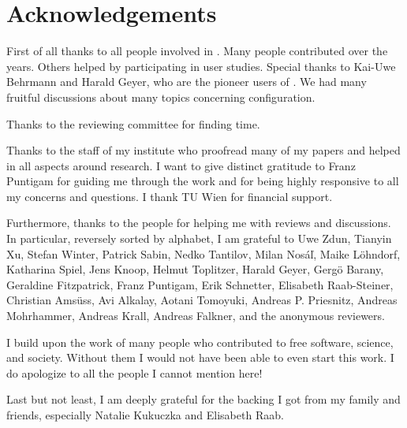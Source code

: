 \chapter{Acknowledgements}


First of all thanks to all people involved in \elektra{}.
Many people contributed over the years.
Others helped by participating in user studies.
Special thanks to Kai-Uwe Behrmann and Harald Geyer, who are the pioneer users of \elektra{}.
We had many fruitful discussions about many topics concerning configuration.

Thanks to the reviewing committee for finding time.

Thanks to the staff of my institute who proofread many of my papers and helped in all aspects around research.
I want to give distinct gratitude to Franz Puntigam for guiding me through the work and for being highly responsive to all my concerns and questions.
I thank TU Wien for financial support.

Furthermore, thanks to the people for helping me with reviews and discussions.
In particular, reversely sorted by alphabet, I am grateful to
Uwe Zdun,
Tianyin Xu,
Stefan Winter,
Patrick Sabin,
Nedko Tantilov,
Milan Nosáľ,
Maike Löhndorf,
Katharina Spiel,
Jens Knoop,
Helmut Toplitzer,
Harald Geyer,
Gergö Barany,
Geraldine Fitzpatrick,
Franz Puntigam,
Erik Schnetter,
Elisabeth Raab-Steiner,
Christian Amsüss,
Avi Alkalay,
Aotani Tomoyuki,
Andreas P. Priesnitz,
Andreas Mohrhammer,
Andreas Krall,
Andreas Falkner,
and the anonymous reviewers.

I build upon the work of many people who contributed to free software, science, and society.
Without them I would not have been able to even start this work.
I do apologize to all the people I cannot mention here!

Last but not least, I am deeply grateful for the backing I got from my family and friends, especially Natalie Kukuczka and Elisabeth Raab.
